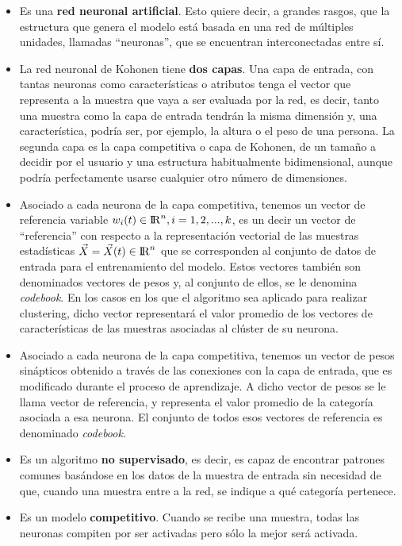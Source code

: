 \begin{itemize}
	\item Es una \textbf{red neuronal artificial}. Esto quiere decir, a grandes rasgos, que la estructura que genera el modelo está basada en una red de múltiples unidades, llamadas ``neuronas'', que se encuentran interconectadas entre sí.
	
	\item La red neuronal de Kohonen tiene \textbf{dos capas}. Una capa de entrada, con tantas neuronas como características o atributos tenga el vector que representa a la muestra que vaya a ser evaluada por la red, es decir, tanto una muestra como la capa de entrada tendrán la misma dimensión y, una característica, podría ser, por ejemplo, la altura o el peso de una persona. La segunda capa es la capa competitiva o capa de Kohonen, de un tamaño a decidir por el usuario y una estructura habitualmente bidimensional, aunque podría perfectamente usarse cualquier otro número de dimensiones.

	\item Asociado a cada neurona de la capa competitiva, tenemos un vector de referencia variable $w_i(t) \in {\rm I\!R}^n, i=1,2, ..., k$, es un decir un vector de ``referencia'' con respecto a la representación vectorial de las muestras estadísticas $\vec{X} = \vec{X}(t) \in {\rm I\!R}^n$ que se corresponden al conjunto de datos de entrada para el entrenamiento del modelo. Estos vectores también son denominados vectores de pesos y, al conjunto de ellos, se le denomina \textit{codebook}. En los casos en los que el algoritmo sea aplicado para realizar clustering, dicho vector representará el valor promedio de los vectores de características de las muestras asociadas al clúster de su neurona. 

	\item Asociado a cada neurona de la capa competitiva, tenemos un vector de pesos sinápticos obtenido a través de las conexiones con la capa de entrada, que es modificado durante el proceso de aprendizaje. A dicho vector de pesos se le llama vector de referencia, y representa el valor promedio de la categoría asociada a esa neurona. El conjunto de todos esos vectores de referencia es denominado \textit{codebook}.

	\item Es un algoritmo \textbf{no supervisado}, es decir, es capaz de encontrar patrones comunes basándose en los datos de la muestra de entrada sin necesidad de que, cuando una muestra entre a la red, se indique a qué categoría pertenece.

	\item Es un modelo \textbf{competitivo}. Cuando se recibe una muestra, todas las neuronas compiten por ser activadas pero sólo la mejor será activada.
\end{itemize}

